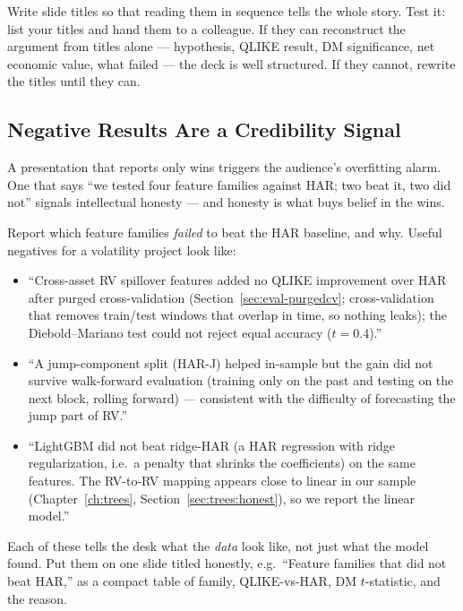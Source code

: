 \begin{keyidea}
Write slide titles so that reading them in sequence tells the whole story. Test it: list your titles and hand them to a colleague. If they can reconstruct the argument from titles alone --- hypothesis, QLIKE result, DM significance, net economic value, what failed --- the deck is well structured. If they cannot, rewrite the titles until they can.
\end{keyidea}

\subsection{Negative Results Are a Credibility Signal}
\label{subsec:negatives}

A presentation that reports only wins triggers the audience's overfitting alarm. One that says ``we tested four feature families against HAR; two beat it, two did not'' signals intellectual honesty --- and honesty is what buys belief in the wins.

Report which feature families \emph{failed} to beat the HAR baseline, and why. Useful negatives for a volatility project look like:
\begin{itemize}[leftmargin=1.5em]
  \item ``Cross-asset RV spillover features added no QLIKE improvement over HAR after purged cross-validation (Section~\ref{sec:eval-purgedcv}; cross-validation that removes train/test windows that overlap in time, so nothing leaks); the Diebold--Mariano test could not reject equal accuracy ($t = 0.4$).''
  \item ``A jump-component split (HAR-J) helped in-sample but the gain did not survive walk-forward evaluation (training only on the past and testing on the next block, rolling forward) --- consistent with the difficulty of forecasting the jump part of RV.''
  \item ``LightGBM did not beat ridge-HAR (a HAR regression with ridge regularization, i.e.\ a penalty that shrinks the coefficients) on the same features. The RV-to-RV mapping appears close to linear in our sample (Chapter~\ref{ch:trees}, Section~\ref{sec:trees:honest}), so we report the linear model.''
\end{itemize}
Each of these tells the desk what the \emph{data} look like, not just what the model found. Put them on one slide titled honestly, e.g.\ ``Feature families that did not beat HAR,'' as a compact table of family, QLIKE-vs-HAR, DM $t$-statistic, and the reason.

